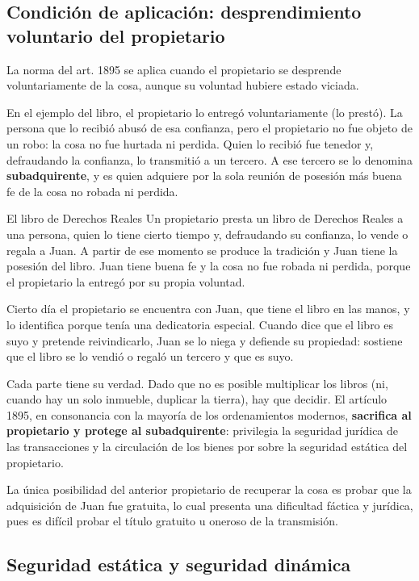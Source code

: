 \documentclass[12pt,oneside]{book}
\begin{document}
\subsection{Condición de aplicación: desprendimiento voluntario del propietario}

La norma del art. 1895 se aplica cuando el propietario se desprende voluntariamente de la cosa, aunque su voluntad hubiere estado viciada.

En el ejemplo del libro, el propietario lo entregó voluntariamente (lo prestó). La persona que lo recibió abusó de esa confianza, pero el propietario no fue objeto de un robo: la cosa no fue hurtada ni perdida. Quien lo recibió fue tenedor y, defraudando la confianza, lo transmitió a un tercero. A ese tercero se lo denomina \textbf{subadquirente}, y es quien adquiere por la sola reunión de posesión más buena fe de la cosa no robada ni perdida.

\begin{example}{El libro de Derechos Reales}
Un propietario presta un libro de Derechos Reales a una persona, quien lo tiene cierto tiempo y, defraudando su confianza, lo vende o regala a Juan. A partir de ese momento se produce la tradición y Juan tiene la posesión del libro. Juan tiene buena fe y la cosa no fue robada ni perdida, porque el propietario la entregó por su propia voluntad.

Cierto día el propietario se encuentra con Juan, que tiene el libro en las manos, y lo identifica porque tenía una dedicatoria especial. Cuando dice que el libro es suyo y pretende reivindicarlo, Juan se lo niega y defiende su propiedad: sostiene que el libro se lo vendió o regaló un tercero y que es suyo.

Cada parte tiene su verdad. Dado que no es posible multiplicar los libros (ni, cuando hay un solo inmueble, duplicar la tierra), hay que decidir. El artículo 1895, en consonancia con la mayoría de los ordenamientos modernos, \textbf{sacrifica al propietario y protege al subadquirente}: privilegia la seguridad jurídica de las transacciones y la circulación de los bienes por sobre la seguridad estática del propietario.

La única posibilidad del anterior propietario de recuperar la cosa es probar que la adquisición de Juan fue gratuita, lo cual presenta una dificultad fáctica y jurídica, pues es difícil probar el título gratuito u oneroso de la transmisión.
\end{example}

\subsection{Seguridad estática y seguridad dinámica}
\end{document}
